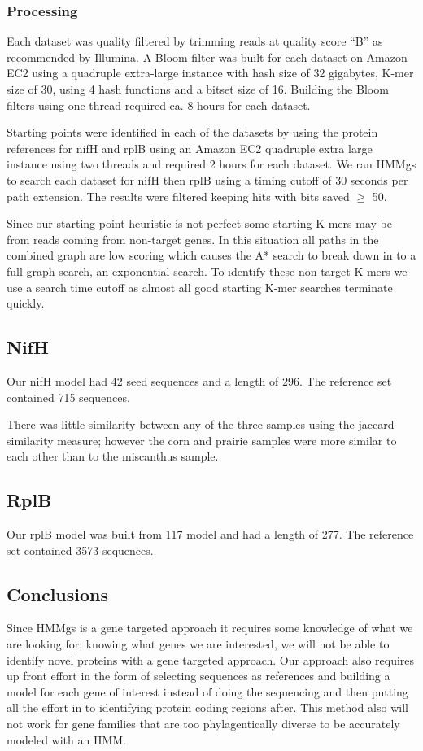 \documentclass[10pt]{bmc_article}
\newenvironment{bmcformat}{\begin{raggedright}\baselineskip20pt\sloppy\setboolean{publ}{false}}{\end{raggedright}\baselineskip20pt\sloppy}
\begin{document}
\begin{bmcformat}
\subsubsection*{Processing}
Each dataset was quality filtered by trimming reads at quality score “B” as recommended by Illumina\cite{Mann2009}.  A Bloom filter was built for each dataset on Amazon EC2 using a quadruple extra-large instance with hash size of 32 gigabytes, K-mer size of 30, using 4 hash functions and a bitset size of 16. Building the Bloom filters using one thread required ca. 8 hours for each dataset.

Starting points were identified in each of the datasets by using the protein references for nifH and rplB using an Amazon EC2 quadruple extra large instance using two threads and required 2 hours for each dataset. We ran HMMgs to search each dataset for nifH then rplB using a timing cutoff of 30 seconds per path extension. The results were filtered keeping hits with bits saved $\ge$ 50.

Since our starting point heuristic is not perfect some starting K-mers may be from reads coming from non-target genes.  In this situation all paths in the combined graph are low scoring which causes the A* search to break down in to a full graph search, an exponential search.  To identify these non-target K-mers we use a search time cutoff as almost all good starting K-mer searches terminate quickly.

\subsection*{NifH}
Our nifH model had 42 seed sequences and a length of 296.  The reference set contained 715 sequences.

There was little similarity between any of the three samples using the jaccard similarity measure; however the corn and prairie samples were more similar to each other than to the miscanthus sample.

\subsection*{RplB}
Our rplB model was built from 117 model and had a length of 277.  The reference set contained 3573 sequences.
    

\subsection*{Conclusions}
Since HMMgs is a gene targeted approach it requires some knowledge of what we are looking for; knowing what genes we are interested, we will not be able to identify novel proteins with a gene targeted approach.  Our approach also requires up front effort in the form of selecting sequences as references and building a model for each gene of interest instead of doing the sequencing and then putting all the effort in to identifying protein coding regions after.  This method also will not work for gene families that are too phylagentically diverse to be accurately modeled with an HMM.


\end{bmcformat}
\end{document}
